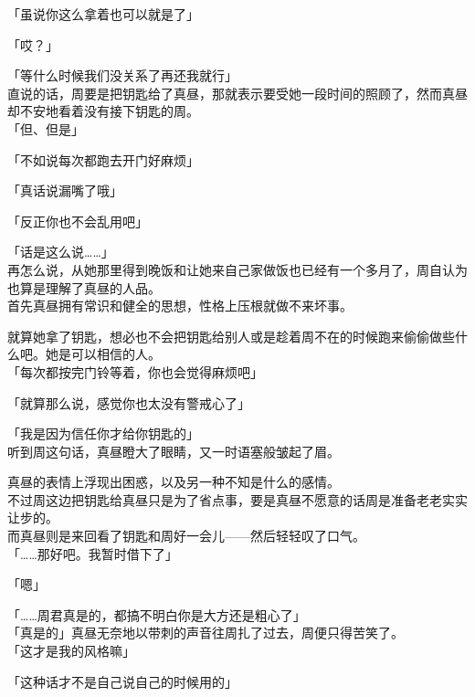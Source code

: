 「虽说你这么拿着也可以就是了」

「哎？」

「等什么时候我们没关系了再还我就行」\\

直说的话，周要是把钥匙给了真昼，那就表示要受她一段时间的照顾了，然而真昼却不安地看着没有接下钥匙的周。\\

「但、但是」

「不如说每次都跑去开门好麻烦」

「真话说漏嘴了哦」

「反正你也不会乱用吧」

「话是这么说……」\\

再怎么说，从她那里得到晚饭和让她来自己家做饭也已经有一个多月了，周自认为也算是理解了真昼的人品。\\

首先真昼拥有常识和健全的思想，性格上压根就做不来坏事。

就算她拿了钥匙，想必也不会把钥匙给别人或是趁着周不在的时候跑来偷偷做些什么吧。她是可以相信的人。\\

「每次都按完门铃等着，你也会觉得麻烦吧」

「就算那么说，感觉你也太没有警戒心了」

「我是因为信任你才给你钥匙的」\\

听到周这句话，真昼瞪大了眼睛，又一时语塞般皱起了眉。

真昼的表情上浮现出困惑，以及另一种不知是什么的感情。\\

不过周这边把钥匙给真昼只是为了省点事，要是真昼不愿意的话周是准备老老实实让步的。\\

而真昼则是来回看了钥匙和周好一会儿——然后轻轻叹了口气。\\

「……那好吧。我暂时借下了」

「嗯」

「……周君真是的，都搞不明白你是大方还是粗心了」\\

「真是的」真昼无奈地以带刺的声音往周扎了过去，周便只得苦笑了。\\

「这才是我的风格嘛」

「这种话才不是自己说自己的时候用的」\\


